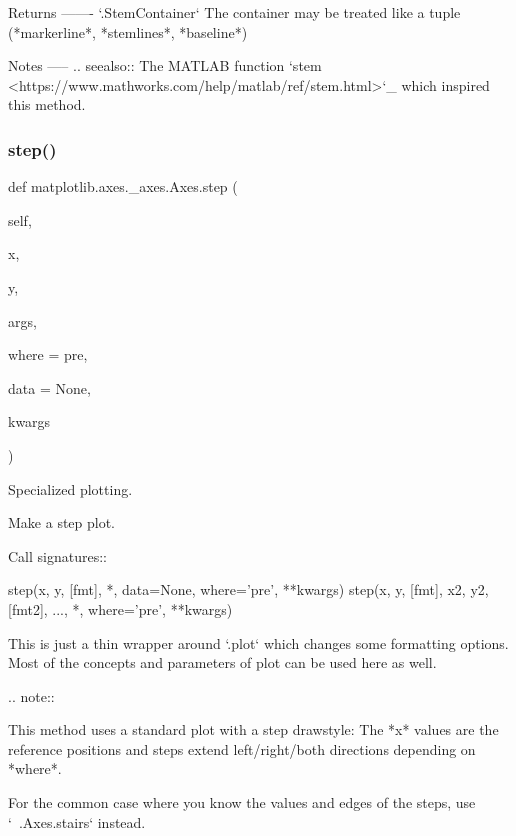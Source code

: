 \begin{DoxyVerb}
\begin{DoxyVerb}
Returns
-------
`.StemContainer`
    The container may be treated like a tuple
    (*markerline*, *stemlines*, *baseline*)

Notes
-----
.. seealso::
    The MATLAB function
    `stem <https://www.mathworks.com/help/matlab/ref/stem.html>`_
    which inspired this method.
\end{DoxyVerb}
 \mbox{\label{classmatplotlib_1_1axes_1_1__axes_1_1Axes_a1e0d2f9a2b9a28defee1c8632c5db143}} 
\subsubsection{\texorpdfstring{step()}{step()}}
{\footnotesize\ttfamily def matplotlib.\+axes.\+\_\+axes.\+Axes.\+step (\begin{DoxyParamCaption}\item[{}]{self,  }\item[{}]{x,  }\item[{}]{y,  }\item[{}]{args,  }\item[{}]{where = {\ttfamily \textquotesingle{}pre\textquotesingle{}},  }\item[{}]{data = {\ttfamily None},  }\item[{}]{kwargs }\end{DoxyParamCaption})}



Specialized plotting. 

\begin{DoxyVerb}Make a step plot.

Call signatures::

    step(x, y, [fmt], *, data=None, where='pre', **kwargs)
    step(x, y, [fmt], x2, y2, [fmt2], ..., *, where='pre', **kwargs)

This is just a thin wrapper around `.plot` which changes some
formatting options. Most of the concepts and parameters of plot can be
used here as well.

.. note::

    This method uses a standard plot with a step drawstyle: The *x*
    values are the reference positions and steps extend left/right/both
    directions depending on *where*.

    For the common case where you know the values and edges of the
    steps, use `~.Axes.stairs` instead.


\end{DoxyVerb}
\end{DoxyVerb}
